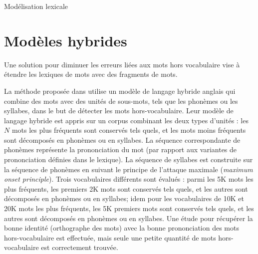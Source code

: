 \documentclass{style/these}
\let\oldcite=\cite
\renewcommand{\cite}[1]{{\fontfamily{qcs}\selectfont{\color{darkerblue}[\oldcite{#1}]}}}
\begin{document}
\begin{part}{Modélisation lexicale}
\section{Modèles hybrides}
\renewcommand{\rightmark}{Modèles hybrides}

Une solution pour diminuer les erreurs liées aux mots hors vocabulaire vise à étendre les lexiques de mots avec des fragments de mots.

La méthode proposée dans \cite{Yazgan:2004} utilise un modèle de langage hybride anglais qui combine des mots avec des unités de sous-mots, tels que les phonèmes ou les syllabes, dans le but de détecter les mots hors-vocabulaire. 
Leur modèle de langage hybride est appris sur un corpus combinant les deux types d'unités : les $N$ mots les plus fréquents sont conservés tels quels, et les mots moins fréquents sont décomposés en phonèmes ou en syllabes. 
La séquence correspondante de phonèmes représente la prononciation du mot (par rapport aux variantes de prononciation définies dans le lexique). La séquence de syllabes est construite sur la séquence de phonèmes en suivant le principe de l'attaque maximale (\textit{maximum onset principle}). 
Trois vocabulaires différents sont évalués : parmi les 5K mots les plus fréquents, les premiers 2K mots sont conservés tels quels, et les autres sont décomposés en phonèmes ou en syllabes; idem pour les vocabulaires de 10K et 20K mots les plus fréquents, les 5K premiers mots sont conservés tels quels, et les autres sont décomposés en phonèmes ou en syllabes. 
Une étude pour récupérer la bonne identité (orthographe des mots) avec la bonne prononciation des mots hors-vocabulaire est effectuée, mais seule une petite quantité de mots hors-vocabulaire est correctement trouvée. 


\end{part}
\end{document}
